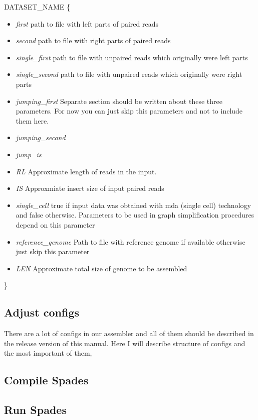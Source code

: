 \documentclass[a4paper,10pt]{article}
\begin{document}
DATASET\_NAME
\{
\begin{itemize}
\item {\it first} path to file with left parts of paired reads
\item{\it second} path to file with right parts of paired reads
\item{\it single\_first} path to file with unpaired reads which originally were left parts
\item{\it single\_second} path to file with unpaired reads which originally were right parts
\item{\it jumping\_first} Separate section should be written about these three parameters. For now you can just skip this parameters and not to include them here.
\item{\it jumping\_second}
\item{\it jump\_is} 
\item{\it RL} Approximate length of reads in the input.
\item{\it IS} Approxmiate insert size of input paired reads
\item{\it single\_cell} true if input data was obtained with mda (single cell) technology and false otherwise. Parameters to be used in graph simplification procedures depend on this parameter
\item{\it reference\_genome} Path to file with reference genome if available otherwise just skip this parameter
\item{\it LEN} Approximate total size of genome to be assembled
\end{itemize}
\}

\subsection{Adjust configs}
There are a lot of configs in our assembler and all of them should be described in the release version of this manual. Here I will describe structure of configs and the most important of them, 

\subsection{Compile Spades}

\subsection{Run Spades}
\end{document}
